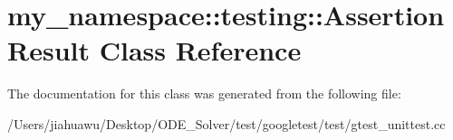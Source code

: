 \hypertarget{classmy__namespace_1_1testing_1_1_assertion_result}{}\section{my\+\_\+namespace\+:\+:testing\+:\+:Assertion\+Result Class Reference}
\label{classmy__namespace_1_1testing_1_1_assertion_result}


The documentation for this class was generated from the following file\+:\begin{DoxyCompactItemize}
\item 
/\+Users/jiahuawu/\+Desktop/\+O\+D\+E\+\_\+\+Solver/test/googletest/test/gtest\+\_\+unittest.\+cc\end{DoxyCompactItemize}
